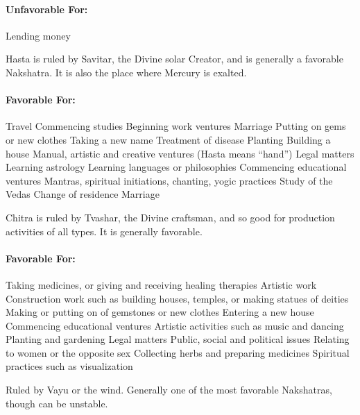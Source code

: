 \paragraph{Unfavorable For:}

Lending money
 


Hasta is ruled by Savitar, the Divine solar Creator, and is generally a favorable Nakshatra. It is also the place where Mercury is exalted.

 

\paragraph{Favorable For:}

Travel
Commencing studies
Beginning work ventures
Marriage
Putting on gems or new clothes
Taking a new name
Treatment of disease
Planting
Building a house
Manual, artistic and creative ventures (Hasta means “hand”)
Legal matters
Learning astrology
Learning languages or philosophies
Commencing educational ventures
Mantras, spiritual initiations, chanting, yogic practices
Study of the Vedas
Change of residence
Marriage
 


Chitra is ruled by Tvashar, the Divine craftsman, and so good for production activities of all types. It is generally favorable.

 

\paragraph{Favorable For:}

Taking medicines, or giving and receiving healing therapies
Artistic work
Construction work such as building houses, temples, or making statues of deities Making or putting on of gemstones or new clothes
Entering a new house
Commencing educational ventures
Artistic activities such as music and dancing
Planting and gardening
Legal matters
Public, social and political issues
Relating to women or the opposite sex
Collecting herbs and preparing medicines
Spiritual practices such as visualization
 


Ruled by Vayu or the wind. Generally one of the most favorable Nakshatras, though can be unstable.

